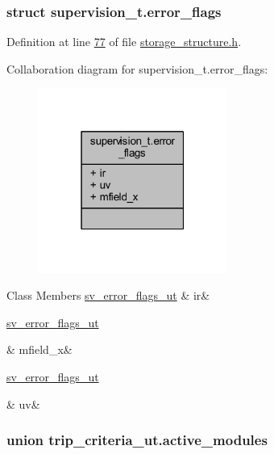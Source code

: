 \subsubsection{struct supervision\+\_\+t.\+error\+\_\+flags}


Definition at line \hyperlink{a00003_source_l00077}{77} of file \hyperlink{a00003_source}{storage\+\_\+structure.\+h}.



Collaboration diagram for supervision\+\_\+t.\+error\+\_\+flags\+:
\nopagebreak
\begin{figure}[H]
\begin{center}
\leavevmode
\includegraphics[width=175pt]{dc/d28/a00223}
\end{center}
\end{figure}
\begin{DoxyFields}{Class Members}
\hypertarget{a00003_ad74eea4899a61f9fcbc527ef988ea0ff}{\hyperlink{a00003_d2/df5/a00137}{sv\+\_\+error\+\_\+flags\+\_\+ut}}\label{a00003_ad74eea4899a61f9fcbc527ef988ea0ff}
&
ir&
\\
\hline

\hypertarget{a00003_a46709d870ad5c3126599a53675c43291}{\hyperlink{a00003_d2/df5/a00137}{sv\+\_\+error\+\_\+flags\+\_\+ut}}\label{a00003_a46709d870ad5c3126599a53675c43291}
&
mfield\+\_\+x&
\\
\hline

\hypertarget{a00003_a45210da832f9626829457a65e9e7c4d0}{\hyperlink{a00003_d2/df5/a00137}{sv\+\_\+error\+\_\+flags\+\_\+ut}}\label{a00003_a45210da832f9626829457a65e9e7c4d0}
&
uv&
\\
\hline

\end{DoxyFields}
\label{d5/db1/a00140}
\hypertarget{a00003_d5/db1/a00140}{}
\subsubsection{union trip\+\_\+criteria\+\_\+ut.\+active\+\_\+modules}


